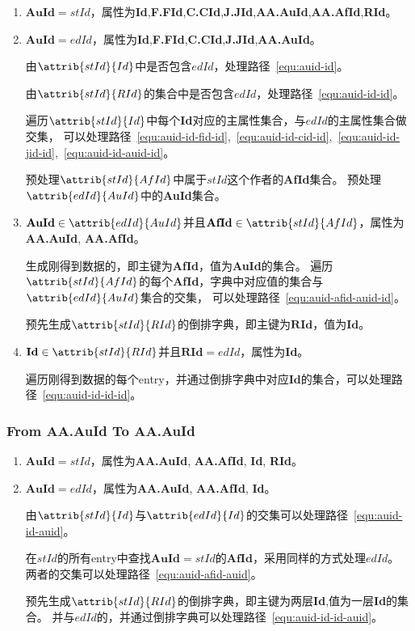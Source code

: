 \documentclass[hyperref,UTF8]{ctexart}
\theoremstyle{definition}
\theoremstyle{remark}
\numberwithin{equation}{subsection}
\newcommand{\Emph}{\textbf}
\newcommand{\Evaluate}{\Emph{Evaluate}}
\newcommand{\Id}{\Emph{Id}}
\newcommand{\RId}{\Emph{RId}}
\newcommand{\FFId}{\Emph{F.FId}}
\newcommand{\CCId}{\Emph{C.CId}}
\newcommand{\JJId}{\Emph{J.JId}}
\newcommand{\AAAuId}{\Emph{AA.AuId}}
\newcommand{\AAAfId}{\Emph{AA.AfId}}
\begin{document}
	\begin{enumerate}[(1)]
	
		\item {}$\Emph{AuId}=stId$，属性为\Id,\FFId,\CCId,\JJId,\AAAuId,\AAAfId,\RId。
	
		\item {}$\Emph{AuId}=edId$，属性为\Id,\FFId,\CCId,\JJId,\AAAuId。
		
		由$\attrib{stId}{Id}$中是否包含$edId$，处理路径~\ref{equ:auid-id}。
		
		由$\attrib{stId}{RId}$的集合中是否包含$edId$，处理路径~\ref{equ:auid-id-id}。
		
		遍历$\attrib{stId}{Id}$中每个\Emph{Id}对应的主属性集合，与$edId$的主属性集合做交集，
		可以处理路径~\ref{equ:auid-id-fid-id},~\ref{equ:auid-id-cid-id},~\ref{equ:auid-id-jid-id},~\ref{equ:auid-id-auid-id}。
		
		预处理$\attrib{stId}{AfId}$中属于$stId$这个作者的\Emph{AfId}集合。
		预处理$\attrib{edId}{AuId}$中的\Emph{AuId}集合。
		
		\item {}$\Emph{AuId} \in \attrib{edId}{AuId}$并且$\Emph{AfId} \in \attrib{stId}{AfId}$，属性为\AAAuId, \AAAfId。
		
		生成刚得到数据的，即主键为\Emph{AfId}，值为\Emph{AuId}的集合。
		遍历$\attrib{stId}{AfId}$的每个\Emph{AfId}，字典中对应值的集合与$\attrib{edId}{AuId}$集合的交集，
		可以处理路径~\ref{equ:auid-afid-auid-id}。
		
		预先生成$\attrib{stId}{RId}$的倒排字典，即主键为$\Emph{RId}$，值为$\Emph{Id}$。
		
		\item {}$\Emph{Id} \in \attrib{stId}{RId}$并且$\Emph{RId}=edId$，属性为\Id。
		
		遍历刚得到数据的每个entry，并通过倒排字典中对应$\Emph{Id}$的集合，可以处理路径~\ref{equ:auid-id-id-id}。
	
	\end{enumerate}

\subsubsection{From \Emph{AA.AuId} To \Emph{AA.AuId}}

	\begin{enumerate}[(1)]
		
		\item {}$\Emph{AuId}=stId$，属性为\AAAuId, \AAAfId, \Id, \RId。
		
		\item {}$\Emph{AuId}=edId$，属性为\AAAuId, \AAAfId, \Id。
		
		由$\attrib{stId}{Id}$与$\attrib{edId}{Id}$的交集可以处理路径~\ref{equ:auid-id-auid}。
		
		在$stId$的所有entry中查找$\Emph{AuId}=stId$的$\Emph{AfId}$，采用同样的方式处理$edId$。
		两者的交集可以处理路径~\ref{equ:auid-afid-auid}。
		
		预先生成$\attrib{stId}{RId}$的倒排字典，即主键为两层\Emph{Id},值为一层\Emph{Id}的集合。
		并与$edId$的，并通过倒排字典可以处理路径~\ref{equ:auid-id-id-auid}。
		
	\end{enumerate}
	
\end{document}
